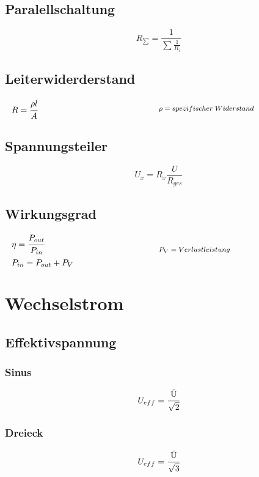 \documentclass[12pt,a5paper,ngerman,titlepage]{article}
\begin{document}
\subsection{Paralellschaltung}
$$R_{\sum} = \frac{1}{\sum \frac{1}{R_{i}}}$$

\subsection{Leiterwiderderstand}
\[
\begin{minipage}{.5\linewidth}
  $R=\cfrac{\rho l}{A}$ 
\end{minipage}%
\begin{minipage}{.5\linewidth}
  \fontsize{8pt}{9pt}\selectfont
  $\rho = spezifischer \; Widerstand$

\end{minipage}
\]
\subsection{Spannungsteiler}
$$U_{x}=R_{x}\frac{U}{R_{ges}}$$

\subsection{Wirkungsgrad}
\[
\begin{minipage}{.5\linewidth}
  $\eta = \cfrac{P_{out}}{P_{in}}$ \\[5pt]
  $P_{in} = P_{out}+P_{V}$
\end{minipage}%
\begin{minipage}{.5\linewidth}
  \fontsize{8pt}{9pt}\selectfont
  $P_{V} = Verlustleistung$

\end{minipage}
\]
\newpage
\section{Wechselstrom}
\subsection{Effektivspannung}
\subsubsection{Sinus}
$$U_{eff}=\cfrac{\text{\^{U}}}{\sqrt{2}}$$
\subsubsection{Dreieck}
$$U_{eff}=\cfrac{\text{\^{U}}}{\sqrt{3}}$$
\end{document}
